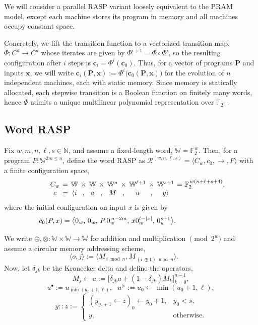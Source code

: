 \documentclass[sigplan,nonacm]{acmart}\settopmatter{printfolios=false,printccs=false,printacmref=false}
\begin{document}
We will consider a parallel RASP variant loosely equivalent to the PRAM~\cite{fortune1978parallelism} model, except each machine stores its program in memory and all machines occupy constant space.

Concretely, we lift the transition function to a vectorized transition map, \(\Phi:C^d\to C^d\) whose iterates are given by \( \Phi^{i+1}=\Phi\circ\Phi^i\), so the resulting configuration after \(i\) steps is \( \mathbf c_i=\Phi^i(\mathbf c_0).\) Thus, for a vector of programs \(\mathbf{P}\) and inputs \(\mathbf x\), we will write \( \mathbf c_i(\mathbf P,\mathbf x):=\Phi^i\bigl(\mathbf c_0(\mathbf P,\mathbf x)\bigr)\) for the evolution of $n$ independent machines, each with static memory. Since memory is statically allocated, each stepwise transition is a Boolean function on finitely many words, hence $\Phi$ admits a unique multilinear polynomial representation over \(\mathbb F_2\)~\cite{mossel2003learning}. %

\subsection{Word RASP}

Fix \(w,m,n,\ell,s\in\mathbb N\), and assume a fixed-length word, \(\mathbb W=\mathbb F_2^w \). Then, for a program \(P : \mathbb W^{2m\leq n}\), define the word RASP as \( \mathcal R^{(w,n,\ell,s)}=\langle C_w,c_0,\to,F\rangle \) with a finite configuration space,
\[
  \setlength{\arraycolsep}{2pt}
  \begin{array}{c c c c c c c c c c c c}
    \phantom{.......}C_w & = & \mathbb W & \times & \mathbb W & \times & \mathbb W^n & \times & \mathbb W^{\ell+1} & \times & \mathbb W^{s+1} & = \mathbb F_2^{\,w(n+\ell+s+4)},\\
    \phantom{.......}c   & = & \langle i & , & a & , & M & , & u & , & y \rangle &
  \end{array}\vspace{0.1cm}
\]
\noindent where the initial configuration on input $x$ is given by
\[
  c_0(P, x) =
  \big\langle
  0_w,\,
  0_w,\,
  P\,0_w^{\,n-2m},\,
  x0_w^{\ell-|x|},\,
  0_w^{s+1}
  \big\rangle. \phantom{extra extr space}\vspace{0.1cm}
\]

\noindent We write \( \oplus, \otimes: \mathbb{W} \times \mathbb{W} \rightarrow \mathbb{W}\) for addition and multiplication \(\pmod{2^w}\) and assume a circular memory addressing scheme,
\[
  \langle o,j\rangle:=\langle M_{\, i\bmod n},M_{\,( i\,\oplus 1)\bmod n}\rangle.\qquad
\]
Now, let $\delta_{jk}$ be the Kronecker delta and define the operators,
\[
  M_j \gets a := \big[\delta_{jk} a + (1-\delta_{jk})M_k\big]_{k=0}^{n-1},
\]
\[
  u^\bullet:=u_{\min(u_0 + 1,\ell)},
  \:\:\:
  u^\triangleright:=u_0 \gets \min( u_0 + 1,\ell),
\]
\[
  y :: z:=
  \begin{cases}
    (y_{y_0 + 1} \gets z)_{0} \gets y_0 + 1,
    &  y_0<s,\\
    y, & \text{otherwise.}
  \end{cases}
\]
\end{document}
